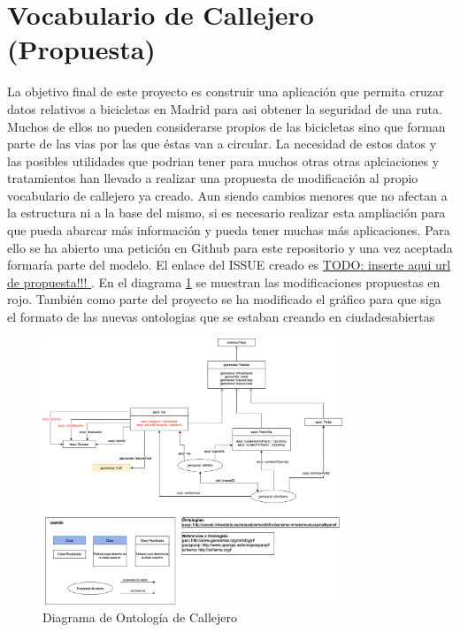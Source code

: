 \section{Vocabulario de Callejero (Propuesta)}

La objetivo final de este proyecto es construir una aplicación que permita cruzar datos relativos a bicicletas en Madrid para asi obtener la seguridad de una ruta. Muchos de ellos no pueden considerarse propios de las bicicletas sino que forman parte de las vias por las que éstas van a circular. La necesidad de estos datos y las posibles utilidades que podrian tener para muchos otras otras aplciaciones y tratamientos han llevado a realizar una propuesta de modificación al propio vocabulario de callejero ya creado.\newline
Aun siendo cambios menores que no afectan a la estructura ni a la base del mismo, si es necesario realizar esta ampliación para que pueda abarcar más información y pueda tener muchas más aplicaciones.\newline
Para ello se ha abierto una petición en Github para este repositorio y una vez aceptada formaría parte del modelo. El enlace del ISSUE creado es \url{TODO: inserte aqui url de propuesta!!! }.
\newline
\newline
En el diagrama \ref{fig:diagramaOntologCicloCarr} se muestran las modificaciones propuestas en rojo. También como parte del proyecto se ha modificado el gráfico para que siga el formato de las nuevas ontologias que se estaban creando en ciudadesabiertas \cite{ciudadesabiertas_catalogoVocabs}

\begin{figure}[h]
	\centering
		\includegraphics[angle=0, width=0.8\textwidth]{images/diagramaCallejero.png}  
	\caption{Diagrama de Ontología de Callejero}
	\label{fig:diagramaOntologCicloCarr}
\end{figure}


